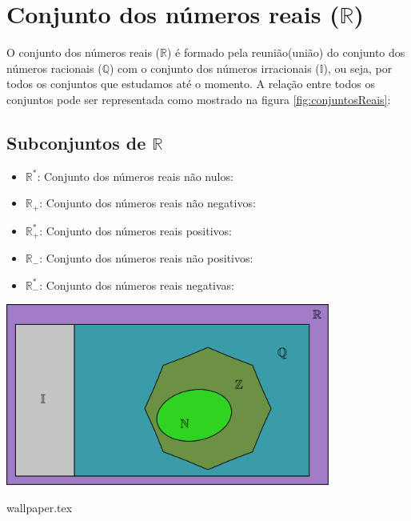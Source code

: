 \documentclass[10pt]{article}
\begin{document}
\section*{Conjunto dos números reais (\( \mathbb{R} \))}
O conjunto dos números reais (\( \mathbb{R} \)) é formado pela reunião(união) do conjunto dos números racionais (\( \mathbb{Q}\)) com o conjunto dos números irracionais (\( \mathbb{I}\)), ou seja, por todos os conjuntos que estudamos até o momento. A relação entre todos os conjuntos pode ser representada como mostrado na figura \ref{fig:conjuntosReais}:
\begin{multicols}{2}
\subsection*{Subconjuntos de \(\mathbb{R}\)}
\begin{itemize}
        \item \( \mathbb{R}^* \): Conjunto dos números reais não nulos:
        \item \( \mathbb{R}_+ \): Conjunto dos números reais não negativos:
        \item \( \mathbb{R}^*_+ \): Conjunto dos números reais positivos:
        \item  \( \mathbb{R}_- \): Conjunto dos números reais não positivos:
        \item  \( \mathbb{R}^*_- \): Conjunto dos números reais negativas:
    \end{itemize}
\columnbreak
\bigskip
\noindent
    \begin{minipage}{\linewidth}
        \centering 
        \includegraphics[width=0.8\textwidth]{imgs/conjuntosNumerico/conjuntosReais.pdf}
        \label{fig:conjuntosReais} 
    \end{minipage}%
\end{multicols} 
\newpage
{wallpaper.tex} %
\end{document}
